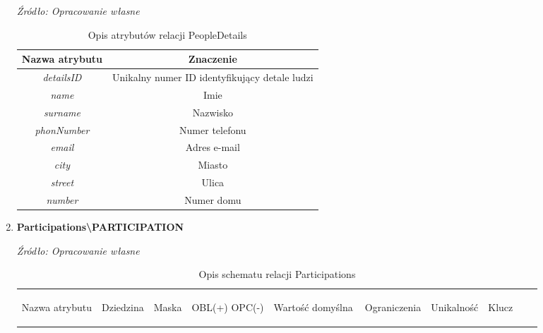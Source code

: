 \documentclass[12pt,twoside]{report}
\begin{document}
\begin{enumerate}[start=10,label={\bfseries REL\textbackslash\arabic*}]
	\begin{table}[H]
		\caption{Opis atrybutów relacji PeopleDetails}
		\textit{Źródło: Opracowanie własne}
		\label{PeopleDetailsAttributeDescription}
		\centering
		\begin{tabular}{|c|c|}
			\hline
			Nazwa atrybutu & Znaczenie \\
			\hline			
			\textit{detailsID}& Unikalny numer ID identyfikujący detale ludzi\\	
			\hline			
			\textit{name}& Imie \\	
			\hline			
			\textit{surname}& Nazwisko\\	
			\hline			
			\textit{phonNumber}& Numer telefonu\\	
			\hline			
			\textit{email}& Adres e-mail\\	
			\hline			
			\textit{city}& Miasto \\	
			\hline			
			\textit{street}& Ulica\\	
			\hline			
			\textit{number}& Numer domu\\	
			\hline
		\end{tabular}
	\end{table}
	\item \textbf{Participations\textbackslash PARTICIPATION} 
	\begin{table}[H]
		\caption{Opis schematu relacji Participations}
		\textit{Źródło: Opracowanie własne}
		\label{ParticipationsRelationSchema}
		\centering
		\begin{tabular}{|c|c|c|c|c|c|c|c|c|c|}
			\hline
			\begin{sideways}Nazwa atrybutu\end{sideways}& 
			\begin{sideways}Dziedzina \end{sideways}& 
			\begin{sideways}Maska \end{sideways}& 
			\begin{sideways}OBL(+) OPC(-)\end{sideways} & 
			\begin{sideways}Wartość domyślna$\ $\end{sideways}& 
			\begin{sideways}Ograniczenia\end{sideways} &
			\begin{sideways}Unikalność \end{sideways}& 
			\begin{sideways}Klucz \end{sideways}& 

\end{tabular}
\end{table}
\end{enumerate}
\end{document}
